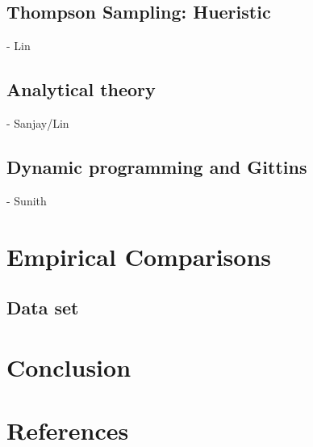 \documentclass{article}
\begin{document}
\subsection{Thompson Sampling: Hueristic}

- Lin

\subsection{Analytical theory}

- Sanjay/Lin

\subsection{Dynamic programming and Gittins}

- Sunith


\section{Empirical Comparisons}

\subsection{Data set}

\section{Conclusion}

\section{References}
\end{document}
